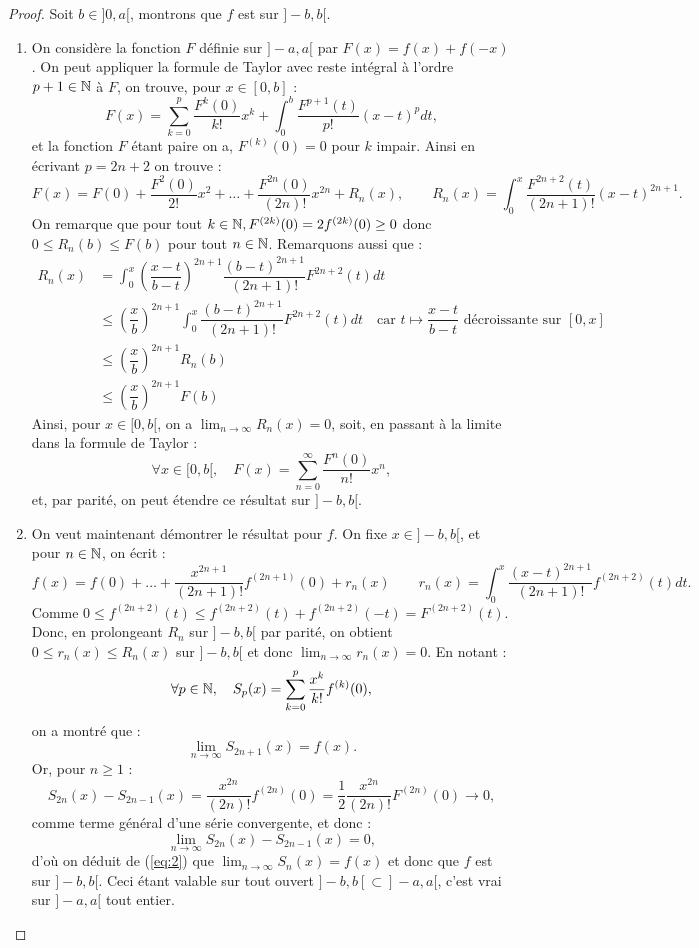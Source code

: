 \begin{proof}
Soit $b \in ]0,a[$, montrons que $f$ est \dse sur $]-b, b[$.

\begin{enumerate}[label=(\roman*)]

\item
On considère la fonction $F$ définie sur $]-a,a[$ par $F(x) = f(x) + f(-x)$. 
On peut appliquer la formule de Taylor avec reste intégral à l'ordre $p +1\in \mathbb{N}$ à $F$, on trouve, pour $x \in [0,b]$ :
\[ F(x) = \sum_{k=0}^p \dfrac{F^{k}(0)}{k!} x^k + \int_0^b \dfrac{F^{p+1}(t)}{p!} (x-t)^p dt  , \]
et la fonction $F$ étant paire on a, $F^{(k)}(0) = 0$ pour $k$ impair. Ainsi en écrivant $p=2n+2$ on trouve :
\[ F(x) = F(0) + \dfrac{F^{2}(0)}{2!} x^2 + \dots + \dfrac{F^{2n}(0)}{(2n)!} x^{2n} + R_n(x), \qquad 
R_n(x) = \int_0^x \dfrac{F^{2n+2}(t)}{(2n+1)!} (x-t)^{2n+1} . \]
On remarque que pour tout $k \in \mathbb{N}, F^{(2k)}(0) = 2 f^{(2k)}(0) \geq 0$ donc $0 \leq R_n(b) \leq F(b)$ pour tout $n \in \mathbb{N}$.
Remarquons aussi que :
\begin{align*}
R_n(x) & = \int_0^x \left ( \dfrac{x-t}{b-t} \right )^{2n+1} \dfrac{(b-t)^{2n+1}}{(2n+1)!} F^{2n+2}(t) dt \\
& \leq \left ( \dfrac{x}{b} \right )^{2n+1} \int_0^x \dfrac{(b-t)^{2n+1}}{(2n+1)!} F^{2n+2}(t) dt \quad 
\text{car } t \mapsto \dfrac{x-t}{b-t} \text{ décroissante sur } [0,x] \\
& \leq \left ( \dfrac{x}{b} \right )^{2n+1} R_n(b) \\
& \leq \left ( \dfrac{x}{b} \right )^{2n+1} F(b)
\end{align*}
Ainsi, pour $x \in [0,b[$, on a $\lim_{n \to \infty} R_n(x) = 0$, soit, en passant à la limite dans la formule de Taylor :
\[ \forall x \in [0,b[, \quad F(x) = \sum_{n=0}^{\infty} \dfrac{F^{n}(0)}{n!} x^n , \]
et, par parité, on peut étendre ce résultat sur $]-b,b[$. 

\item
On veut maintenant démontrer le résultat pour $f$. On fixe $x \in ]-b, b[$, et pour $n \in \mathbb{N}$, on écrit :
\[ f(x) = f(0) + \dots + \dfrac{x^{2n+1}}{(2n+1)!} f^{(2n+1)}(0) + r_n(x) \qquad
 r_n(x) = \int_0^x \dfrac{(x-t)^{2n+1}}{(2n+1)!} f^{(2n+2)}(t) dt . \]
Comme $0 \leq  f^{(2n+2)}(t) \leq  f^{(2n+2)}(t) +  f^{(2n+2)}(-t) =  F^{(2n+2)}(t)$.
Donc, en prolongeant $R_n$ sur $]-b, b[$ par parité, on obtient $0 \leq r_n(x) \leq R_n(x)$ sur $]-b, b[$ 
et donc $\lim_{n \to \infty} r_n(x) = 0$. En notant :
\[ \forall p \in \mathbb{N}, \quad S_p(x) = \sum_{k=0}^p \dfrac{x^k}{k!} f^{(k)}(0), \]
on a montré que :
\begin{equation} \lim_{n \to \infty} S_{2n+1}(x) = f(x) \label{eq:2} . \end{equation}
Or, pour $n \geq 1$ :
\[ S_{2n}(x) - S_{2n-1}(x) = \dfrac{x^{2n}}{(2n)!} f^{(2n)}(0) = \dfrac12 \dfrac{x^{2n}}{(2n)!} F^{(2n)}(0) \to 0 , \]
comme terme général d'une série convergente, et donc :
\[ \lim_{n \to \infty} S_{2n}(x) - S_{2n-1}(x) = 0 , \]
d'où on déduit de (\ref{eq:2}) que $\lim_{n \to \infty} S_n(x) = f(x)$ et donc que $f$ est \dse sur $]-b,b[$.
Ceci étant valable sur tout ouvert $]-b, b[ \subset ]-a,a[$, c'est vrai sur $]-a,a[$ tout entier.


\end{enumerate}
\end{proof}
